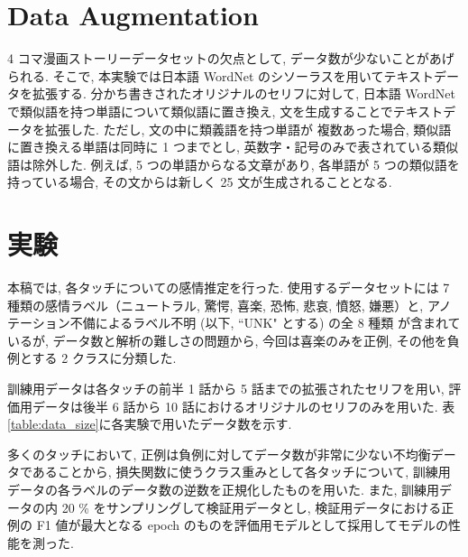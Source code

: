 \documentclass[twocolumn]{jarticle}     %
\begin{document}
\section{Data Augmentation}
4 コマ漫画ストーリーデータセットの欠点として, データ数が少ないことがあげられる. そこで, 本実験では日本語 WordNet \cite{word_net_jp} のシソーラスを用いてテキストデータを拡張する.
分かち書きされたオリジナルのセリフに対して, 日本語 WordNet で類似語を持つ単語について類似語に置き換え, 文を生成することでテキストデータを拡張した. ただし, 文の中に類義語を持つ単語が
複数あった場合, 類似語に置き換える単語は同時に 1 つまでとし, 英数字・記号のみで表されている類似語は除外した. 例えば, 5 つの単語からなる文章があり,
各単語が 5 つの類似語を持っている場合, その文からは新しく 25 文が生成されることとなる.

\section{実験}
本稿では, 各タッチについての感情推定を行った.
使用するデータセットには 7 種類の感情ラベル（ニュートラル, 驚愕, 喜楽, 恐怖, 悲哀, 憤怒, 嫌悪）と, アノテーション不備によるラベル不明 (以下, ``UNK" とする) の全 8 種類
が含まれているが, データ数と解析の難しさの問題から, 今回は喜楽のみを正例, その他を負例とする 2 クラスに分類した.

訓練用データは各タッチの前半 1 話から 5 話までの拡張されたセリフを用い,
評価用データは後半 6 話から 10 話におけるオリジナルのセリフのみを用いた.
表\ref{table:data_size}に各実験で用いたデータ数を示す.

多くのタッチにおいて, 正例は負例に対してデータ数が非常に少ない不均衡データであることから, 損失関数に使うクラス重みとして各タッチについて, 訓練用データの各ラベルのデータ数の逆数を正規化したものを用いた. また, 訓練用データの内 20 \% をサンプリングして検証用データとし, 検証用データにおける正例の F1 値が最大となる epoch のものを評価用モデルとして採用してモデルの性能を測った.
\end{document}
